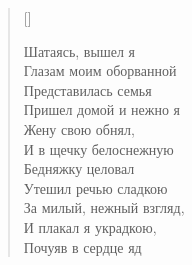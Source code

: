 \begin{verse}[\versewidth]
\begin{altverse}
     Шатаясь, вышел я\ldotst\\
Глазам моим оборванной\\
     Представилась семья\ldotst\\
Пришел домой и нежно я\\
     Жену свою обнял,\\
И в щечку белоснежную\\
     Бедняжку целовал\ldotst\\
Утешил речью сладкою\\
     За милый, нежный взгляд,\\
И плакал я украдкою,\\
     Почуяв в сердце яд\ldotst
\end{altverse}
\end{verse}


\newpage
\vspace*{0cm}

